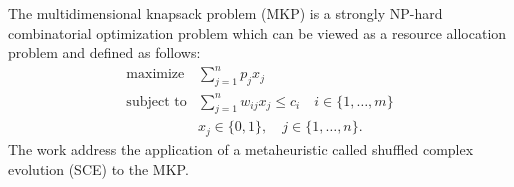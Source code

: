 The multidimensional knapsack problem (MKP) is a strongly NP-hard combinatorial
optimization problem which can be viewed as a resource allocation problem and
defined as follows:
\begin{align*}
  \text{maximize} & \sum_{j=1}^n p_j x_j \\
  \text{subject to} & \sum_{j=1}^n w_{ij} x_j \leqslant c_i \quad i \in \{1, \ldots, m\}\\
   & x_j \in \{0, 1\}, \quad j \in \{1, \ldots, n\}.
\end{align*}
The work address the application of a metaheuristic called
shuffled complex evolution (SCE) to the MKP.
